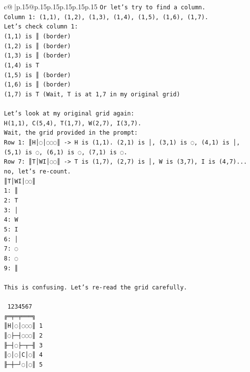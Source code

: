 \documentclass{article}
\begin{document}
{\begin{supertabular}{c@{$\;$}|p{.15\linewidth}@{}p{.15\linewidth}p{.15\linewidth}p{.15\linewidth}p{.15\linewidth}p{.15\linewidth}}
{{{\texttt{Or let's try to find a column.} \\
\texttt{Column 1: (1,1), (1,2), (1,3), (1,4), (1,5), (1,6), (1,7).} \\
\texttt{Let's check column 1:} \\
\texttt{(1,1) is ║ (border)} \\
\texttt{(1,2) is ║ (border)} \\
\texttt{(1,3) is ║ (border)} \\
\texttt{(1,4) is T} \\
\texttt{(1,5) is ║ (border)} \\
\texttt{(1,6) is ║ (border)} \\
\texttt{(1,7) is T (Wait, T is at 1,7 in my original grid)} \\
\\ 
\texttt{Let's look at my original grid again:} \\
\texttt{H(1,1), C(5,4), T(1,7), W(2,7), I(3,7).} \\
\texttt{Wait, the grid provided in the prompt:} \\
\texttt{Row 1: ║H│◌│◌◌◌║ {-}> H is (1,1). (2,1) is │, (3,1) is ◌, (4,1) is │, (5,1) is ◌, (6,1) is ◌, (7,1) is ◌.} \\
\texttt{Row 7: ║T│WI│◌◌║ {-}> T is (1,7), (2,7) is │, W is (3,7), I is (4,7)... no, let's re{-}count.} \\
\texttt{║T│WI│◌◌║} \\
\texttt{1: ║} \\
\texttt{2: T} \\
\texttt{3: │} \\
\texttt{4: W} \\
\texttt{5: I} \\
\texttt{6: │} \\
\texttt{7: ◌} \\
\texttt{8: ◌} \\
\texttt{9: ║} \\
\\ 
\texttt{This is confusing. Let's re{-}read the grid carefully.} \\
\\ 
\texttt{ 1234567} \\
\texttt{╔═╤═╤═══╗} \\
\texttt{║H│◌│◌◌◌║ 1} \\
\texttt{║◌├─┤◌◌◌║ 2} \\
\texttt{╟─┤◌├─┬─╢ 3} \\
\texttt{║◌│◌│C│◌║ 4} \\
\texttt{╟─┼─┘◌│◌║ 5} \\
}}}
\end{supertabular}}
\end{document}

